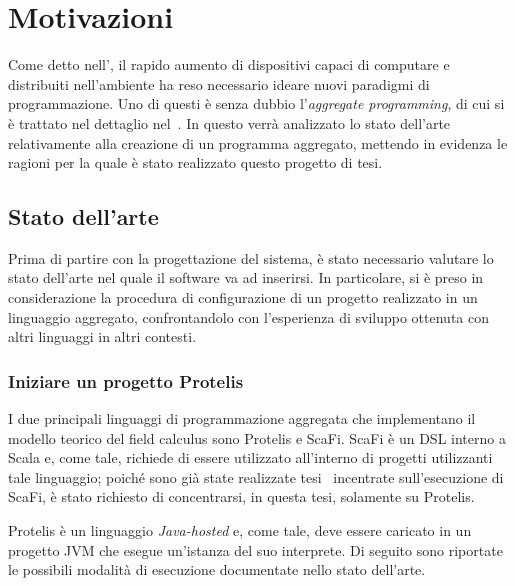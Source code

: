 \chapter{Motivazioni}\label{ch:motivations}

  Come detto nell', il rapido aumento di dispositivi capaci di computare e distribuiti nell'ambiente ha reso necessario ideare nuovi paradigmi di programmazione.
  Uno di questi è senza dubbio l'\emph{aggregate programming}, di cui si è trattato nel dettaglio nel~.
  In questo  verrà analizzato lo stato dell'arte relativamente alla creazione di un programma aggregato,
  mettendo in evidenza le ragioni per la quale è stato realizzato questo progetto di tesi.

  \section{Stato dell'arte}\label{sec:state-of-art}

  Prima di partire con la progettazione del sistema, è stato necessario valutare lo stato dell'arte nel quale il software va ad inserirsi.
  In particolare, si è preso in considerazione la procedura di configurazione di un progetto realizzato in un linguaggio aggregato,
  confrontandolo con l'esperienza di sviluppo ottenuta con altri linguaggi in altri contesti.

  \subsection{Iniziare un progetto Protelis}\label{subsec:setup}

  I due principali linguaggi di programmazione aggregata che implementano il modello teorico del field calculus sono Protelis e ScaFi.
  ScaFi è un DSL interno a Scala e, come tale, richiede di essere utilizzato all'interno di progetti utilizzanti tale linguaggio;
  poiché sono già state realizzate tesi~\cite{amslaurea12188,amslaurea16824} incentrate sull'esecuzione di ScaFi,
  è stato richiesto di concentrarsi, in questa tesi, solamente su Protelis.

  Protelis è un linguaggio \emph{Java-hosted} e, come tale, deve essere caricato in un progetto JVM che esegue un'istanza del suo interprete.
  Di seguito sono riportate le possibili modalità di esecuzione documentate nello stato dell'arte.

